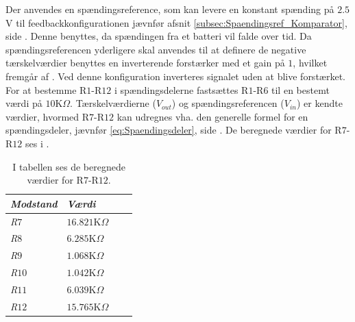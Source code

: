 \noindent Der anvendes en spændingsreference, som kan levere en konstant spænding på $2.5$V til feedbackkonfigurationen jævnfør afsnit \ref{subsec:Spaendingsref_Komparator}, side \pageref{subsec:Spaendingsref_Komparator}. Denne benyttes, da spændingen fra et batteri vil falde over tid. 
Da spændingsreferencen yderligere skal anvendes til at definere de negative tærskelværdier benyttes en inverterende forstærker med et gain på $1$, hvilket fremgår af . Ved denne konfiguration inverteres signalet uden at blive forstærket. \\
For at bestemme R$1$-R$12$ i spændingsdelerne fastsættes R$1$-R$6$ til en bestemt værdi på $10$K$\Omega$. Tærskelværdierne ($V_{out}$) og spændingsreferencen ($V_{in}$) er kendte værdier, hvormed R$7$-R$12$ kan udregnes vha. den generelle formel for en spændingsdeler, jævnfør \eqref{eq:Spaendingsdeler}, side \pageref{subsec:Spaendingsref}. De beregnede værdier for R$7$-R$12$ ses i .
\begin{table}[H]
	\centering
	\begin{tabular}{|l|l|l|l|} \hline
		\textit{Modstand} & \textit{Værdi} \\ \hline
	\textit{R$7$} & $16.821$K$\Omega$ \\ \hline
	\textit{R$8$} & $6.285$K$\Omega$ \\ \hline
	\textit{R$9$} & $1.068$K$\Omega$ \\ \hline
	\textit{R$10$} & $1.042$K$\Omega$ \\ \hline
	\textit{R$11$} & $6.039$K$\Omega$ \\ \hline
	\textit{R$12$} & $15.765$K$\Omega$ \\ \hline    
	\end{tabular}
	\caption{I tabellen ses de beregnede værdier for R$7$-R$12$.}
	\label{tab:modtande_R7-R12}
\end{table}


